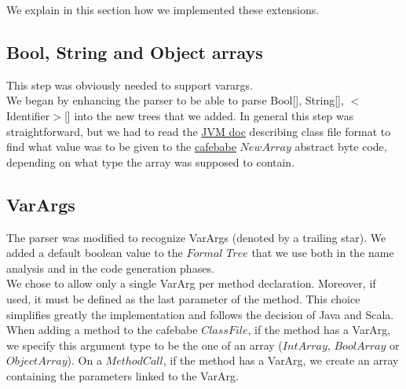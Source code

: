 We explain in this section how we implemented these extensions.

%
%

\subsection{Bool, String and Object arrays}
This step was obviously needed to support varargs.\\
We began by enhancing the parser to be able to parse Bool[], String[], $<$Identifier$>$[] into the new trees that we added. In general this step was straightforward, but we had to read the \href{http://docs.oracle.com/javase/specs/jvms/se7/html/jvms-4.html\#jvms-4.9.1-120-O}{JVM doc} describing class file format to find what value was to be given to the \href{https://github.com/psuter/cafebabe}{cafebabe} $NewArray$ abstract byte code, depending on what type the array was supposed to contain.

\subsection{VarArgs}
The parser was modified to recognize VarArgs (denoted by a trailing star). We added a default boolean value to the $Formal$ $Tree$ that we use both in the name analysis and in the code generation phases.\\
We chose to allow only a single VarArg per method declaration. Moreover, if used, it must be defined as the last parameter of the method. This choice simplifies greatly the implementation and follows the decision of Java and Scala.\\
When adding a method to the cafebabe $ClassFile$, if the method has a VarArg, we specify this argument type to be the one of an array ($IntArray$, $BoolArray$ or $ObjectArray$).
On a $MethodCall$, if the method has a VarArg, we create an array containing the parameters linked to the VarArg.

